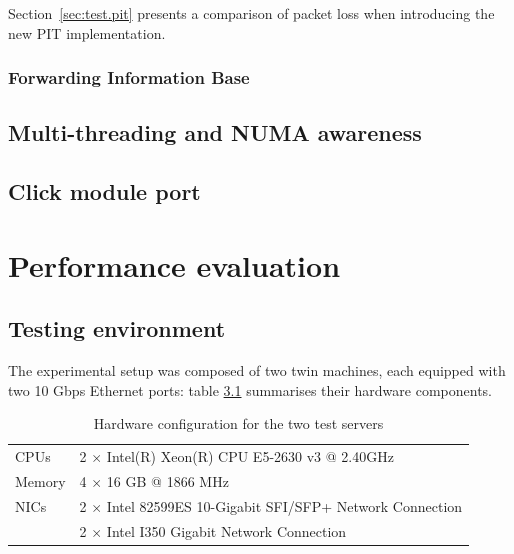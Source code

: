 \documentclass[12pt,a4paper,twoside]{book}
\begin{document}
Section~\ref{sec:test.pit} presents a comparison of packet loss when introducing the new PIT implementation.

\subsection{Forwarding Information Base}\label{sec:augustus.fib}

\section{Multi-threading and NUMA awareness}\label{sec:augustus.numa}
\todo[inline]{}

\section{Click module port}\label{sec:augustus.click}



\chapter{Performance evaluation}
\label{chap:test}

\section{Testing environment}\label{sec:test.env}
The experimental setup was composed of two twin machines, each equipped with two 10 Gbps Ethernet ports:
table \ref{tab:test.hw} summarises their hardware components.

\begin{table}[tb]
  \begin{center}
    \begin{tabular}{ll}
      \toprule
      CPUs   & 2 $\times$ Intel(R) Xeon(R) CPU E5-2630 v3 @ 2.40GHz \\
      Memory & 4 $\times$ 16 GB @ 1866 MHz\\
      NICs   & 2 $\times$ Intel 82599ES 10-Gigabit SFI/SFP+ Network Connection \\
             & 2 $\times$ Intel I350 Gigabit Network Connection \\
      \bottomrule
    \end{tabular}
  \end{center}
  \caption{Hardware configuration for the two test servers}
  \label{tab:test.hw}
\end{table}
\end{document}
